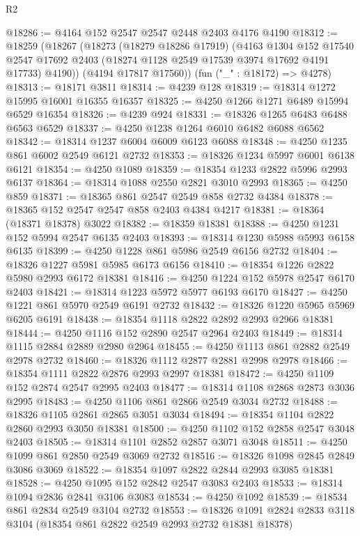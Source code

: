 \begin{lexlean}{R2}
\begin{coremodule}
@18286 := @4164 @152 @2547 @2547 @2448 @2403 @4176 @4190
@18312 := @18259
    (@18267
      (@18273
        (@18279 @18286 @17919)
        (@4163
          @1304
          @152
          @17540
          @2547
          @17692
          @2403
          (@18274 @1128 @2549 @17539 @3974 @17692 @4191 @17733)
          @4190))
      (@4194 @17817 @17560))
    (fun ("_" : @18172) => @4278)
@18313 := @18171 @3811
@18314 := @4239 @128
@18319 := @18314 @1272 @15995 @16001 @16355 @16357
@18325 := @4250 @1266 @1271 @6489 @15994 @6529 @16354
@18326 := @4239 @924
@18331 := @18326 @1265 @6483 @6488 @6563 @6529
@18337 := @4250 @1238 @1264 @6010 @6482 @6088 @6562
@18342 := @18314 @1237 @6004 @6009 @6123 @6088
@18348 := @4250 @1235 @861 @6002 @2549 @6121 @2732
@18353 := @18326 @1234 @5997 @6001 @6138 @6121
@18354 := @4250 @1089
@18359 := @18354 @1233 @2822 @5996 @2993 @6137
@18364 := @18314 @1088 @2550 @2821 @3010 @2993
@18365 := @4250 @859
@18371 := @18365 @861 @2547 @2549 @858 @2732 @4384
@18378 := @18365 @152 @2547 @2547 @858 @2403 @4384 @4217
@18381 := @18364 (@18371 @18378) @3022
@18382 := @18359 @18381
@18388 := @4250 @1231 @152 @5994 @2547 @6135 @2403
@18393 := @18314 @1230 @5988 @5993 @6158 @6135
@18399 := @4250 @1228 @861 @5986 @2549 @6156 @2732
@18404 := @18326 @1227 @5981 @5985 @6173 @6156
@18410 := @18354 @1226 @2822 @5980 @2993 @6172 @18381
@18416 := @4250 @1224 @152 @5978 @2547 @6170 @2403
@18421 := @18314 @1223 @5972 @5977 @6193 @6170
@18427 := @4250 @1221 @861 @5970 @2549 @6191 @2732
@18432 := @18326 @1220 @5965 @5969 @6205 @6191
@18438 := @18354 @1118 @2822 @2892 @2993 @2966 @18381
@18444 := @4250 @1116 @152 @2890 @2547 @2964 @2403
@18449 := @18314 @1115 @2884 @2889 @2980 @2964
@18455 := @4250 @1113 @861 @2882 @2549 @2978 @2732
@18460 := @18326 @1112 @2877 @2881 @2998 @2978
@18466 := @18354 @1111 @2822 @2876 @2993 @2997 @18381
@18472 := @4250 @1109 @152 @2874 @2547 @2995 @2403
@18477 := @18314 @1108 @2868 @2873 @3036 @2995
@18483 := @4250 @1106 @861 @2866 @2549 @3034 @2732
@18488 := @18326 @1105 @2861 @2865 @3051 @3034
@18494 := @18354 @1104 @2822 @2860 @2993 @3050 @18381
@18500 := @4250 @1102 @152 @2858 @2547 @3048 @2403
@18505 := @18314 @1101 @2852 @2857 @3071 @3048
@18511 := @4250 @1099 @861 @2850 @2549 @3069 @2732
@18516 := @18326 @1098 @2845 @2849 @3086 @3069
@18522 := @18354 @1097 @2822 @2844 @2993 @3085 @18381
@18528 := @4250 @1095 @152 @2842 @2547 @3083 @2403
@18533 := @18314 @1094 @2836 @2841 @3106 @3083
@18534 := @4250 @1092
@18539 := @18534 @861 @2834 @2549 @3104 @2732
@18553 := @18326
    @1091
    @2824
    @2833
    @3118
    @3104
    (@18354 @861 @2822 @2549 @2993 @2732 @18381 @18378)

\end{coremodule}
\end{lexlean}
